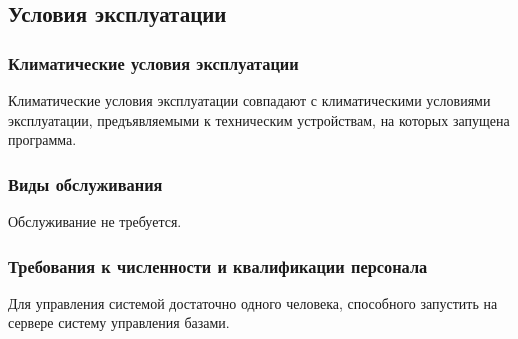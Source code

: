 \subsection{Условия эксплуатации}

\subsubsection{Климатические условия эксплуатации}

Климатические условия эксплуатации совпадают с климатическими условиями эксплуатации, предъявляемыми к техническим устройствам, на которых запущена программа.

\subsubsection{Виды обслуживания}

Обслуживание не требуется. 

\subsubsection{Требования к численности и квалификации персонала}

Для управления системой достаточно одного человека, способного запустить на сервере систему управления базами.